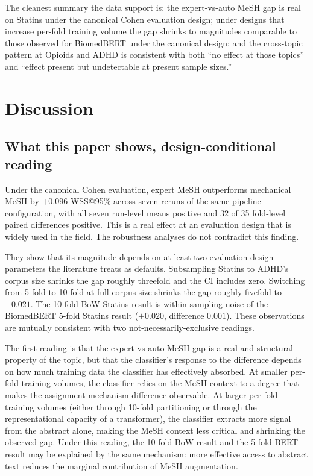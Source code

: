 \documentclass{article}
\begin{document}
The cleanest summary the data support is: the expert-vs-auto MeSH gap is real on Statins under the canonical Cohen evaluation design; under designs that increase per-fold training volume the gap shrinks to magnitudes comparable to those observed for BiomedBERT under the canonical design; and the cross-topic pattern at Opioids and ADHD is consistent with both ``no effect at those topics'' and ``effect present but undetectable at present sample sizes.''

\section{Discussion}

\subsection{What this paper shows, design-conditional reading}\label{sec:discussion-design}

Under the canonical Cohen evaluation, expert MeSH outperforms mechanical MeSH by $+0.096$ WSS@95\% across seven reruns of the same pipeline configuration, with all seven run-level means positive and 32 of 35 fold-level paired differences positive. This is a real effect at an evaluation design that is widely used in the field. The robustness analyses do not contradict this finding.

They show that its magnitude depends on at least two evaluation design parameters the literature treats as defaults. Subsampling Statins to ADHD's corpus size shrinks the gap roughly threefold and the CI includes zero. Switching from 5-fold to 10-fold at full corpus size shrinks the gap roughly fivefold to $+0.021$. The 10-fold BoW Statins result is within sampling noise of the BiomedBERT 5-fold Statins result ($+0.020$, difference $0.001$). These observations are mutually consistent with two not-necessarily-exclusive readings.

The first reading is that the expert-vs-auto MeSH gap is a real and structural property of the topic, but that the classifier's response to the difference depends on how much training data the classifier has effectively absorbed. At smaller per-fold training volumes, the classifier relies on the MeSH context to a degree that makes the assignment-mechanism difference observable. At larger per-fold training volumes (either through 10-fold partitioning or through the representational capacity of a transformer), the classifier extracts more signal from the abstract alone, making the MeSH context less critical and shrinking the observed gap. Under this reading, the 10-fold BoW result and the 5-fold BERT result may be explained by the same mechanism: more effective access to abstract text reduces the marginal contribution of MeSH augmentation.
\end{document}
